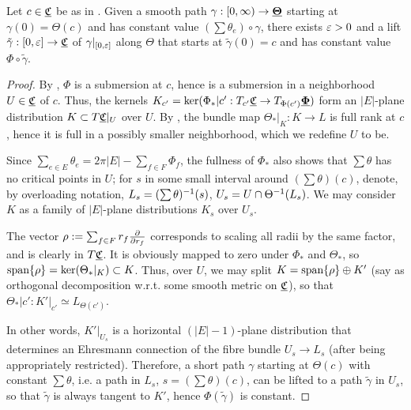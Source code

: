 \begin{proposition}
\label{p:nghd_lift}
Let $c\in {\underline{\mathfrak{C}}}$ be as in .
Given a smooth path $\gamma: [0,\infty) \to {\underline{\mathbf{\Theta}}}$
starting at $\gamma(0) = \Theta(c)$
and has constant value $(\sum \theta_e) \circ \gamma$,
there exists $\varepsilon > 0$ and a lift $\tilde{\gamma} :[0, \varepsilon] \to {\underline{\mathfrak{C}}}$
of $\gamma|_{[0,\varepsilon]}$ along $\Theta$
that starts at $\tilde{\gamma}(0) = c$
and has constant value $\Phi \circ \tilde{\gamma}$.
\end{proposition}


\begin{proof}
By , $\Phi$ is a submersion at $c$,
hence is a submersion in a neighborhood $U \in {\underline{\mathfrak{C}}}$ of $c$.
Thus, the kernels
$K_{c'} = \ker(\Phi_*|{c'} : T_{c'} {\underline{\mathfrak{C}}} \to T_{\Phi(c')} {\underline{\mathbf{\Phi}}})$
form an $|E|$-plane distribution $K \subset T{\underline{\mathfrak{C}}}|_U$ over $U$.
By , the bundle map
$\Theta_*|_K : K \to L$ is full rank at $c$,
hence it is full in a possibly smaller neighborhood,
which we redefine $U$ to be.


Since $\sum_{e \in E} \theta_e = 2\pi |E| - \sum_{f\in F} \Phi_f$,
the fullness of $\Phi_*$ also shows that
$\sum \theta$ has no critical points in $U$;
for $s$ in some small interval around $(\sum \theta)(c)$,
denote, by overloading notation,
$L_s = (\sum \theta)^{-1} (s)$,
$U_s = U \cap \Theta^{-1}(L_s)$.
We may consider $K$ as a family of $|E|$-plane distributions
$K_s$ over $U_s$.


The vector $\rho := \sum_{f\in F} r_f {\frac{\partial}{\partial r_f}}$ corresponds to
scaling all radii by the same factor, and is clearly in $T{\underline{\mathfrak{C}}}$.
It is obviously mapped to zero under $\Phi_*$ and $\Theta_*$,
so ${\text{span}}\{\rho\} = \ker(\Theta_*|_K) \subset K$.
Thus, over $U$, we may split
$K = {\text{span}}\{\rho\} \oplus K'$
(say as orthogonal decomposition w.r.t. some smooth metric on ${\underline{\mathfrak{C}}}$),
so that $\Theta_*|{c'} : K'|_{c'} \simeq L_{\Theta(c')}$.


In other words, $K'|_{U_s}$ is a horizontal $(|E|-1)$-plane distribution
that determines an Ehresmann connection of the
fibre bundle $U_s \to L_s$ (after being appropriately restricted).
Therefore, a short path $\gamma$ starting at $\Theta(c)$
with constant $\sum \theta$, i.e. a path in $L_s$, $s ={(\sum \theta)(c)}$,
can be lifted to a path $\tilde{\gamma}$ in $U_s$,
so that $\tilde{\gamma}$ is always tangent to $K'$,
hence $\Phi(\tilde{\gamma})$ is constant.
\end{proof}

